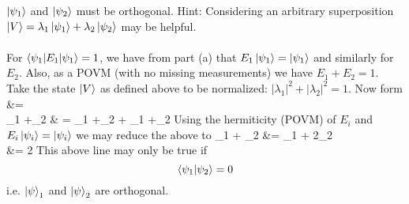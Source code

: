 \documentclass[10pt,letterpaper]{article}
\begin{document}
	$\ket{\psi_1}$ and $\ket{\psi_2}$ must be orthogonal. Hint: Considering an arbitrary superposition
	$\ket V = \lambda_1\ket{\psi_1} +\lambda_2\ket{\psi_2}$ may be helpful. 
	\\ \\
	For $\braket{\psi_1|E_1|\psi_1} = 1$, we have from part (a) that $E_1\ket{\psi_1} = \ket{\psi_1}$ and similarly for 
	$E_2$. Also, as a POVM (with no missing measurements) we have $E_1+E_2 = 1$. Take the state 
	$\ket V$ as defined above to be normalized: $|\lambda_1|^2+|\lambda_2|^2 = 1$. Now form
	\ba
		 &=  \\
		\lambda_1 +\lambda_2  & = 
		\lambda_1 +\lambda_2 +
		\lambda_1 +\lambda_2
	\ea
	Using the hermiticity (POVM) of $E_i$ and $E_i\ket{\psi_i} = \ket{\psi_i}$ we may reduce the above to
	\ba
		\lambda_1 + \lambda_2  &= \lambda_1 + 2\lambda_2
		\\
		 &= 2
	\ea
	This above line may only be true if 
	\[
		\braket{\psi_1|\psi_2} = 0
	\]
	i.e. $\ket\psi_1$ and $\ket\psi_2$ are orthogonal. 
	\eenum
\eenum
\end{document}

